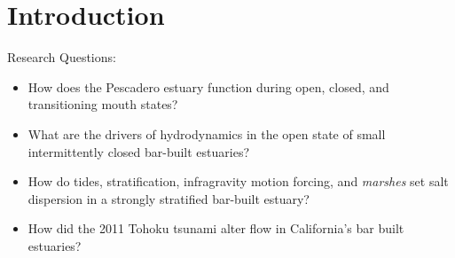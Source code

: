 \chapter{Introduction}
\label{chIntro}

Research Questions:
\begin{itemize}
	\item{How does the Pescadero estuary function during open, closed, and transitioning mouth states?}
	\item{What are the drivers of hydrodynamics in the open state of small intermittently closed bar-built estuaries?}
	\item{How do tides, stratification, infragravity motion forcing, and \emph{marshes} set salt dispersion in a strongly stratified bar-built estuary?}
	\item{How did the 2011 Tohoku tsunami alter flow in California's bar built estuaries?}
\end{itemize}


